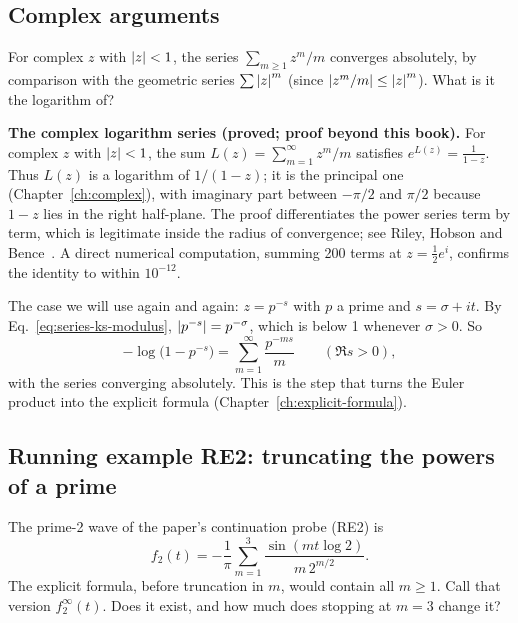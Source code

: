 \subsection{Complex arguments}

For complex $z$ with $\left\lvert z\right\rvert<1$, the series $\sum_{m\ge1}z^m/m$ converges absolutely, by comparison with the geometric series $\sum\left\lvert z\right\rvert^m$ (since $\left\lvert z^m/m\right\rvert\le\left\lvert z\right\rvert^m$). What is it the logarithm of?

\begin{beyond}
\textbf{The complex logarithm series (proved; proof beyond this book).} For complex $z$ with $\left\lvert z\right\rvert<1$, the sum $L(z)=\sum_{m=1}^\infty z^m/m$ satisfies $e^{L(z)}=\frac1{1-z}$. Thus $L(z)$ is a logarithm of $1/(1-z)$; it is the principal one (Chapter~\ref{ch:complex}), with imaginary part between $-\pi/2$ and $\pi/2$ because $1-z$ lies in the right half-plane. The proof differentiates the power series term by term, which is legitimate inside the radius of convergence; see Riley, Hobson and Bence~\cite{rhb}. A direct numerical computation, summing 200 terms at $z=\tfrac12e^{i}$, confirms the identity to within $10^{-12}$.
\end{beyond}

The case we will use again and again: $z=p^{-s}$ with $p$ a prime and $s=\sigma+it$. By Eq.~\eqref{eq:series-ks-modulus}, $\left\lvert p^{-s}\right\rvert=p^{-\sigma}$, which is below 1 whenever $\sigma>0$. So
\[
-\log\bigl(1-p^{-s}\bigr)=\sum_{m=1}^\infty\frac{p^{-ms}}{m}\qquad(\Re s>0),
\]
with the series converging absolutely. This is the step that turns the Euler product into the explicit formula (Chapter~\ref{ch:explicit-formula}).

\subsection{Running example RE2: truncating the powers of a prime}

The prime-2 wave of the paper's continuation probe (RE2) is
\[
f_2(t)=-\frac1\pi\sum_{m=1}^{3}\frac{\sin(mt\log2)}{m\,2^{m/2}} .
\]
The explicit formula, before truncation in $m$, would contain all $m\ge1$. Call that version $f_2^{\infty}(t)$. Does it exist, and how much does stopping at $m=3$ change it?

